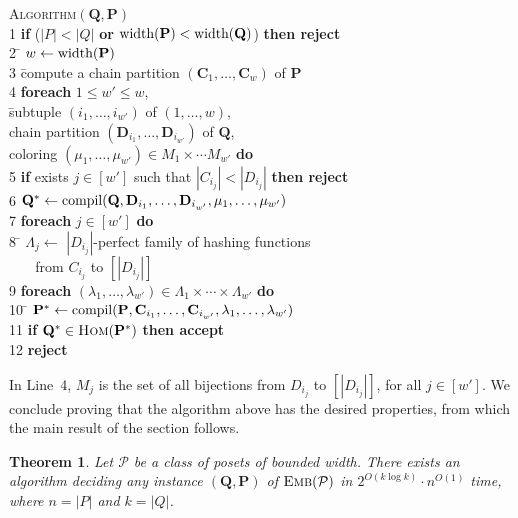 \documentclass[usletter]{article}
\newcommand{\longversion}[1]{#1}
\newcommand{\shortversion}[1]{}
\newcommand{\longshort}[2]{\longversion{#1}\shortversion{#2}}
\newcommand{\cc}{\mathbf{C}}
\newcommand{\dd}{\mathbf{D}}
\newcommand{\pp}{\mathbf{P}}
\newcommand{\qq}{\mathbf{Q}}
\newtheorem{theorem}{Theorem}
\begin{document}
\begin{tabbing}
\textsc{Algorithm}$(\qq,\pp)$\\
1 \quad \= \textbf{if} ($|P|<|Q|$ \textbf{or} $\textup{width}(\pp)<\textup{width}(\qq)$) \textbf{then reject}\\
2 \> \= $w \leftarrow \textup{width}(\pp)$ \\
3 \> \= compute a chain partition $(\cc_1,\ldots,\cc_w)$ of $\pp$ \\
4       \> \textbf{foreach} $1 \leq w' \leq w$,\\
       \> \> \quad \= subtuple $(i_1,\ldots,i_{w'})$ of $(1,\ldots,w)$,\\
       \> \> \> chain partition $(\dd_{i_1},\ldots,\dd_{i_{w'}})$ of $\qq$,\\
       \> \> \> coloring $(\mu_1,\ldots,\mu_{w'}) \in M_1 \times \cdots M_{w'}$ \textbf{do}\\
5       \> \quad \= \textbf{if} exists $j \in [w']$ such that $|C_{i_j}|<|D_{i_j}|$ \textbf{then reject}\\
6       \> \> $\qq^* \leftarrow \textup{compil}(\qq,\dd_{i_1},\ldots,\dd_{i_{w'}},\mu_1,\ldots,\mu_{w'})$\\
7       \>       \> \textbf{foreach} $j \in [w']$  \textbf{do}\\
8       \>       \> \quad \= $\Lambda_j \leftarrow$ $|D_{i_j}|$-perfect family of hashing functions\\\>       \> \>       $\ \ \ \ \ \ \ $ from $C_{i_j}$ to $[|D_{i_j}|]$\\
9       \>       \> \textbf{foreach} $(\lambda_1,\ldots,\lambda_{w'}) \in \Lambda_1 \times \cdots \times \Lambda_{w'}$  \textbf{do}\\
10       \>       \> \quad \= $\pp^* \leftarrow \textup{compil}(\pp,\cc_{i_1},\ldots,\cc_{i_{w'}},\lambda_1,\ldots,\lambda_{w'})$\\
11       \>       \>             \> \textbf{if} $\qq^* \in \textsc{Hom}(\pp^*)$ \textbf{then accept}\\
12      \> \textbf{reject}
\end{tabbing}

In Line~4, $M_j$ is the set of all bijections from $D_{i_j}$ to $[|D_{i_j}|]$, 
for all $j \in [w']$.  We conclude proving that the algorithm above 
has the desired properties, from which the main result of the section follows.

\longshort{\begin{theorem}}{\begin{theorem}[$\star$]}
\label{th:embfpt}
Let $\mathcal{P}$ be a class of posets of bounded width.  There exists an algorithm 
deciding any instance $(\qq,\pp)$ of $\textsc{Emb}(\mathcal{P})$ 
in $2^{O(k\log k)}\cdot n^{O(1)}$ time, 
where $n=|P|$ and $k=|Q|$.
\end{theorem}
\end{document}
